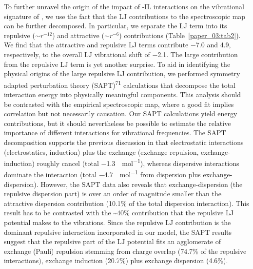 To further unravel the origin of the impact of -IL interactions on the vibrational signature of , we use the fact that the LJ contributions to the spectroscopic map can be further decomposed. In particular, we separate the LJ term into its repulsive (\({\sim r}^{-12}\)) and attractive (\(\sim r^{-6}\)) contributions (Table~\ref{paper_03:tab2}). We find that the attractive and repulsive LJ terms contribute \SI{-7.0}{\wavenumber} and \SI{+4.9}{\wavenumber}, respectively, to the overall LJ vibrational shift of \SI{-2.1}{\wavenumber}. The large contribution from the repulsive LJ term is yet another surprise. To aid in identifying the physical origins of the large repulsive LJ contribution, we performed symmetry adapted perturbation theory (SAPT)\textsuperscript{71} calculations that decompose the total interaction energy into physically meaningful components. This analysis should be contrasted with the empirical spectroscopic map, where a good fit implies correlation but not necessarily causation. Our SAPT calculations yield energy contributions, but it should nevertheless be possible to estimate the relative importance of different interactions for vibrational frequencies. The SAPT decomposition supports the previous discussion in that electrostatic interactions (electrostatics, induction) plus the exchange (exchange repulsion, exchange-induction) roughly cancel (total \SI{-1.3}{\kcal\per\mole}), whereas dispersive interactions dominate the interaction (total \SI{-4.7}{\kcal\per\mole} from dispersion plus exchange-dispersion). However, the SAPT data also reveals that exchange-dispersion (the repulsive dispersion part) is over an order of magnitude smaller than the attractive dispersion contribution (10.1\% of the total dispersion interaction). This result has to be contrasted with the \textasciitilde{}40\% contribution that the repulsive LJ potential makes to the vibrations. Since the repulsive LJ contribution is the dominant repulsive interaction incorporated in our model, the SAPT results suggest that the repulsive part of the LJ potential fits an agglomerate of exchange (Pauli) repulsion stemming from charge overlap (74.7\% of the repulsive interactions), exchange induction (20.7\%) plus exchange dispersion (4.6\%).

